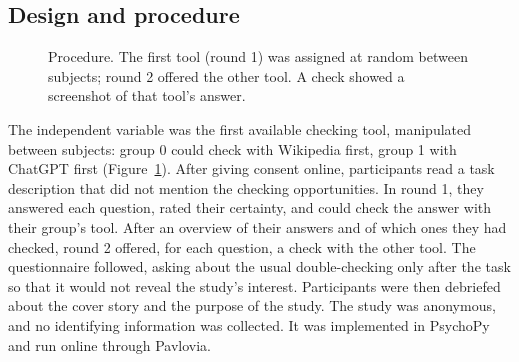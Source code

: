 \documentclass[11pt,a4paper]{article}
\begin{document}
\subsection{Design and procedure}
\begin{figure}[t]
\centering
{}
\caption{Procedure. The first tool (round 1) was assigned at random between subjects; round 2 offered the other tool. A check showed a screenshot of that tool's answer.}
\label{fig:procedure}
\end{figure}

The independent variable was the first available checking tool, manipulated between subjects: group 0 could check with Wikipedia first, group 1 with ChatGPT first (Figure~\ref{fig:procedure}). After giving consent online, participants read a task description that did not mention the checking opportunities. In round 1, they answered each question, rated their certainty, and could check the answer with their group's tool. After an overview of their answers and of which ones they had checked, round 2 offered, for each question, a check with the other tool. The questionnaire followed, asking about the usual double-checking only after the task so that it would not reveal the study's interest. Participants were then debriefed about the cover story and the purpose of the study. The study was anonymous, and no identifying information was collected. It was implemented in PsychoPy and run online through Pavlovia.
\end{document}
